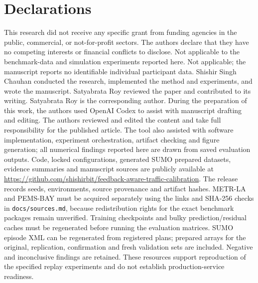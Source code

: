 \documentclass[pdflatex,sn-mathphys-num]{sn-jnl}
\begin{document}
\section*{Declarations}
This research did not receive any specific grant from funding agencies in the public, commercial, or not-for-profit sectors.
The authors declare that they have no competing interests or financial conflicts to disclose.
Not applicable to the benchmark-data and simulation experiments reported here.
Not applicable; the manuscript reports no identifiable individual participant data.
Shishir Singh Chauhan conducted the research, implemented the method and experiments, and wrote the manuscript. Satyabrata Roy reviewed the paper and contributed to its writing. Satyabrata Roy is the corresponding author.
During the preparation of this work, the authors used OpenAI Codex to assist with manuscript drafting and editing. The authors reviewed and edited the content and take full responsibility for the published article. The tool also assisted with software implementation, experiment orchestration, artifact checking and figure generation; all numerical findings reported here are drawn from saved evaluation outputs.
Code, locked configurations, generated SUMO prepared datasets, evidence summaries and manuscript sources are publicly available at \url{https://github.com/shishirbit/feedback-aware-traffic-calibration}. The release records seeds, environments, source provenance and artifact hashes. METR-LA and PEMS-BAY must be acquired separately using the links and SHA-256 checks in \texttt{docs/sources.md}, because redistribution rights for the exact benchmark packages remain unverified. Training checkpoints and bulky prediction/residual caches must be regenerated before running the evaluation matrices. SUMO episode XML can be regenerated from registered plans; prepared arrays for the original, replication, confirmation and fresh validation sets are included. Negative and inconclusive findings are retained. These resources support reproduction of the specified replay experiments and do not establish production-service readiness.
\FloatBarrier
\end{document}
